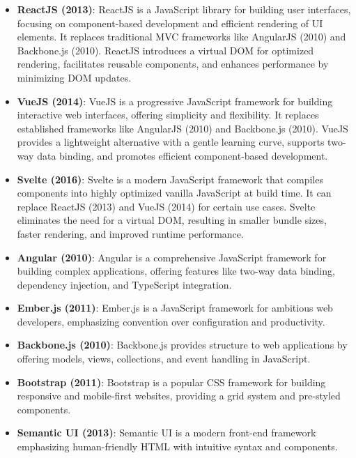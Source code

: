 \documentclass[conference]{IEEEtran}
\begin{document}
\begin{itemize}
    \item \textbf{ReactJS (2013)}:
    ReactJS is a JavaScript library for building user interfaces, focusing on component-based development and efficient rendering of UI elements. It replaces traditional MVC frameworks like AngularJS (2010) and Backbone.js (2010). ReactJS introduces a virtual DOM for optimized rendering, facilitates reusable components, and enhances performance by minimizing DOM updates.
    
    \item \textbf{VueJS (2014)}:
    VueJS is a progressive JavaScript framework for building interactive web interfaces, offering simplicity and flexibility. It replaces established frameworks like AngularJS (2010) and Backbone.js (2010). VueJS provides a lightweight alternative with a gentle learning curve, supports two-way data binding, and promotes efficient component-based development.
    
    \item \textbf{Svelte (2016)}:
    Svelte is a modern JavaScript framework that compiles components into highly optimized vanilla JavaScript at build time. It can replace ReactJS (2013) and VueJS (2014) for certain use cases. Svelte eliminates the need for a virtual DOM, resulting in smaller bundle sizes, faster rendering, and improved runtime performance.
    
    \item \textbf{Angular (2010)}:
    Angular is a comprehensive JavaScript framework for building complex applications, offering features like two-way data binding, dependency injection, and TypeScript integration.
    
    \item \textbf{Ember.js (2011)}:
    Ember.js is a JavaScript framework for ambitious web developers, emphasizing convention over configuration and productivity.
    
    \item \textbf{Backbone.js (2010)}:
    Backbone.js provides structure to web applications by offering models, views, collections, and event handling in JavaScript.
    
    \item \textbf{Bootstrap (2011)}:
    Bootstrap is a popular CSS framework for building responsive and mobile-first websites, providing a grid system and pre-styled components.
    
    \item \textbf{Semantic UI (2013)}:
    Semantic UI is a modern front-end framework emphasizing human-friendly HTML with intuitive syntax and components.
    

\end{itemize}
\end{document}
